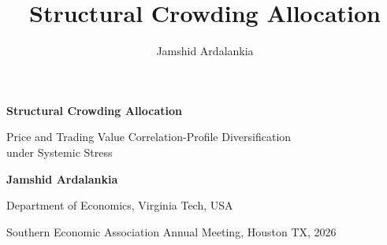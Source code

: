 \documentclass[9pt,aspectratio=169,t]{beamer}
\title{Structural Crowding Allocation}
\author{Jamshid Ardalankia}
\begin{document}
\begingroup
{}

\begin{frame}[plain]
\vspace*{17.5mm}
{\rmfamily\bfseries\color{titleink}\fontsize{20.8}{24}\selectfont Structural Crowding Allocation\par}
\vspace{2.5mm}
{\rmfamily\color{subtle}\fontsize{12.3}{15.1}\selectfont Price and Trading Value Correlation-Profile Diversification\\under Systemic Stress\par}
\vspace{5mm}{\color{slideaccent}\rule{12mm}{.8pt}}\par\vspace{4mm}
{\bfseries\fontsize{7.85}{10.25}\selectfont Jamshid Ardalankia}\par\vspace{.8mm}
{\color{subtle}\fontsize{6.45}{8.45}\selectfont Department of Economics, Virginia Tech, USA}

\par\vspace{.8mm}
{\color{subtle}\fontsize{6.45}{8.45}\selectfont Southern Economic Association Annual Meeting, Houston TX, 2026}
\end{frame}
\end{document}
